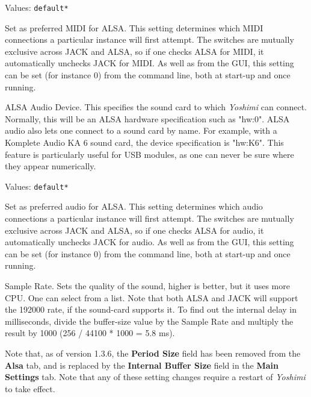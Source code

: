   Values: \texttt{default*}

   Set as preferred MIDI for ALSA.
   This setting determines which MIDI connections a particular instance will
   first attempt. The switches are mutually exclusive across JACK and ALSA,
   so if one checks ALSA for MIDI, it automatically unchecks JACK for MIDI.
   As well as from the GUI, this setting can be set (for instance 0) from the
   command line, both at start-up and once running.

   ALSA Audio Device.
   This specifies the sound card to which \textsl{Yoshimi} can connect.
   Normally, this will be an ALSA hardware specification such as
   "hw:0".
   ALSA audio also lets one connect to a sound card by name. For example,
   with a Komplete Audio KA 6 sound card, the device specification is
   "hw:K6". This feature is particularly useful for USB modules, as one can
   never be sure where they appear numerically.

   Values: \texttt{default*}

   Set as preferred audio for ALSA.
   This setting determines which audio connections a particular instance will
   first attempt. The switches are mutually exclusive across JACK and ALSA,
   so if one checks ALSA for audio, it automatically unchecks JACK for audio.
   As well as from the GUI, this setting can be set (for instance 0) from the
   command line, both at start-up and once running.

   Sample Rate.
   Sets the quality of the sound, higher is better, but it uses more CPU.  One
   can select from a list.  Note that both ALSA and JACK will support the
   192000 rate, if the sound-card supports it.  To find out the internal delay
   in milliseconds, divide the buffer-size value by the Sample Rate and
   multiply the result by 1000 (256 / 44100 * 1000 = 5.8 ms).

   Note that, as of version 1.3.6, the \textbf{Period Size} field has been
   removed from the \textbf{Alsa} tab, and is replaced by the 
   \textbf{Internal Buffer Size} field in the \textbf{Main Settings} tab.
   Note that any of these setting changes require a restart of \textsl{Yoshimi}
   to take effect.
   

